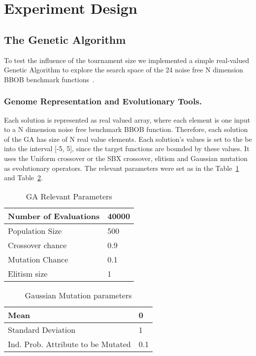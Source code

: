 \section{Experiment Design}

\subsection{The Genetic Algorithm}\label{sec:proposed:ga}

To test the influence of the tournament size we implemented a simple real-valued Genetic Algorithm to explore the search space of the 24 noise free N dimension BBOB benchmark functions~\cite{hansen2010real}.

\subsubsection*{Genome Representation and Evolutionary Tools.}
Each solution is represented as real valued array, where each element is one input to a N dimension noise free benchmark BBOB function. Therefore, each solution of the GA has size of N real value elements. Each solution's values is set to the be into the interval [-5, 5], since the target functions are bounded by these values. It uses the Uniform crossover or the SBX crossover, elitism and Gaussian mutation as evolutionary operators. The relevant parameters were set as in the Table~\ref{relevant_par} and Table~\ref{gaussian_par}.

\vspace{3mm}
\begin{table}[!ht]
	\centering
	\begin{tabular}{|l|l|}
	\hline
	Number of Evaluations & 40000 \\ \hline
	Population Size &  500		\\ \hline
	Crossover chance 	& 0.9	\\ \hline
	Mutation Chance 	& 0.1	\\ \hline		
	Elitism size 		& 1		\\ \hline		
	\end{tabular}
	\caption{GA Relevant Parameters}
	\label{relevant_par}
\end{table}
	\vspace{-2mm}
%
\begin{table}[!ht]
	\centering
	\begin{tabular}{|l|l|}
	\hline
		Mean & 0 \\ \hline		
		Standard Deviation & 1 \\ \hline		
		Ind. Prob. Attribute to be Mutated &  0.1 \\ \hline		
	\end{tabular}
	\caption{Gaussian Mutation parameters}
	\label{gaussian_par}
\end{table}


